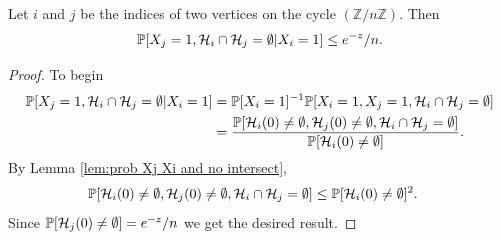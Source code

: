 	\begin{lemma}
		\label{lem:prob Xj and no intersect given Xi}
		Let $i$ and $j$ be the indices of two vertices on the cycle $(\mathbb{Z}/n\mathbb{Z})$. Then
		\begin{equation}
			\mathbb{P}[X_j = 1, \mathcal{H}_i \cap\mathcal{H}_j = \emptyset|X_i = 1] \leq e^{-z}/n.
		\end{equation}
	\end{lemma}
	\begin{proof}
		To begin
		\begin{align}
			\mathbb{P}[X_j = 1, \mathcal{H}_i \cap\mathcal{H}_j = \emptyset|X_i = 1] &= \mathbb{P}[X_i = 1]^{-1}\mathbb{P}[X_i = 1, X_j = 1, \mathcal{H}_i \cap\mathcal{H}_j = \emptyset]\\
			&= \frac{\mathbb{P}[\mathcal{H}_i(0) \neq \emptyset, \mathcal{H}_j(0) \neq \emptyset, \mathcal{H}_i \cap \mathcal{H}_j = \emptyset]}{\mathbb{P}[\mathcal{H}_i(0) \neq \emptyset]}.
		\end{align}
		By Lemma \ref{lem:prob Xj Xi and no intersect},
		\begin{align}
			\mathbb{P}[\mathcal{H}_i(0) \neq \emptyset, \mathcal{H}_j(0) \neq \emptyset, \mathcal{H}_i \cap \mathcal{H}_j = \emptyset] 
			&\leq \mathbb{P}[\mathcal{H}_i(0) \neq \emptyset]^2.
		\end{align} 
		Since $\mathbb{P}[\mathcal{H}_j(0) \neq \emptyset] = e^{-z}/n$ we get the desired result.
	\end{proof}

